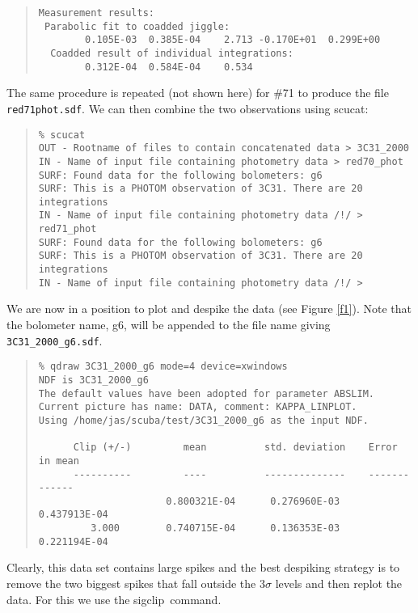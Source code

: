 \documentclass[twoside,11pt,fleqn]{article}
\newenvironment{myquote}{\begin{quote}\begin{small}}{\end{small}\end{quote}}
\newcommand{\task}[1]{{\sf #1}}
\newcommand{\scucat}{\xref{\task{scucat}}{sun216}{SCUCAT}}
\newcommand{\sigclip}{\xref{\task{sigclip}}{sun216}{SIGCLIP}}
\newcommand{\xref}[3]{#1}
\begin{document}
\begin{myquote}
\begin{verbatim}
Measurement results:                                         
 Parabolic fit to coadded jiggle:                            
        0.105E-03  0.385E-04    2.713 -0.170E+01  0.299E+00  
  Coadded result of individual integrations:                 
        0.312E-04  0.584E-04    0.534                         
\end{verbatim}
\end{myquote}

The same procedure is repeated (not shown here) for \#71 to produce
the file {\tt red71phot.sdf}. We can then combine the two observations
using \scucat:

\begin{myquote}
\begin{verbatim}
% scucat
OUT - Rootname of files to contain concatenated data > 3C31_2000
IN - Name of input file containing photometry data > red70_phot
SURF: Found data for the following bolometers: g6
SURF: This is a PHOTOM observation of 3C31. There are 20 integrations
IN - Name of input file containing photometry data /!/ > red71_phot
SURF: Found data for the following bolometers: g6
SURF: This is a PHOTOM observation of 3C31. There are 20 integrations
IN - Name of input file containing photometry data /!/ >  
\end{verbatim}
\end{myquote}

We are now in a position to plot and despike the data (see Figure
\ref{f1}). Note that the bolometer name, g6, will be appended to the file
name giving {\tt 3C31\_2000\_g6.sdf}.

\begin{myquote}
\begin{verbatim}
% qdraw 3C31_2000_g6 mode=4 device=xwindows
NDF is 3C31_2000_g6
The default values have been adopted for parameter ABSLIM.
Current picture has name: DATA, comment: KAPPA_LINPLOT.
Using /home/jas/scuba/test/3C31_2000_g6 as the input NDF.
 
      Clip (+/-)         mean          std. deviation    Error in mean
      ----------         ----          --------------    -------------
                      0.800321E-04      0.276960E-03      0.437913E-04
         3.000        0.740715E-04      0.136353E-03      0.221194E-04 
\end{verbatim}
\end{myquote}

Clearly, this data set contains large spikes and the best despiking
strategy is to remove the two biggest spikes that fall outside the 
3$\sigma$ levels and then replot the data. For this we use the
\sigclip\ command.
\end{document}
